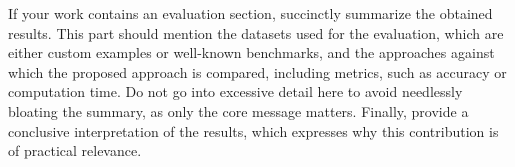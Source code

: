 


\noindent
If your work contains an evaluation section, succinctly summarize the obtained results.
This part should mention the datasets used for the evaluation, which are either custom examples or well-known benchmarks, and the approaches against which the proposed approach is compared, including metrics, such as accuracy or computation time.
Do not go into excessive detail here to avoid needlessly bloating the summary, as only the core message matters.
Finally, provide a conclusive interpretation of the results, which expresses why this contribution is of practical relevance.
